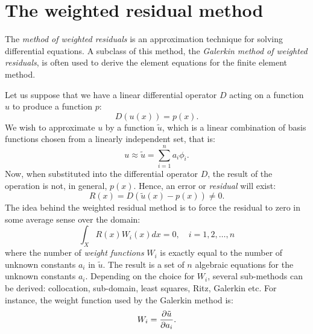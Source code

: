 \chapter{The weighted residual method}
\label{appendix2}

The \emph{method of weighted residuals} is an approximation technique for solving differential equations. A subclass of this method, the \emph{Galerkin method of weighted residuals}, is often used to derive the element equations for the finite element method. 

Let us suppose that we have a linear differential operator $ D $ acting on a function $ u $ to produce a function $ p $:
\begin{equation}
D(u(x)) = p(x).
\end{equation}
We wish to approximate $ u $ by a function $ \tilde{u} $, which is a linear combination of basis functions chosen from a linearly independent set, that is: 
\begin{equation}
u \approx \tilde{u} = \sum_{i=1}^n a_i \phi_i .
\end{equation}
Now, when substituted into the differential operator $ D $, the result of the operation is not, in general, $ p(x) $. Hence, an error or \emph{residual} will exist:
\begin{equation}
R(x) = D(\tilde{u}(x)-p(x)) \neq 0.
\end{equation}
The idea behind the weighted residual method is to force the residual to zero in some average sense over the domain:
\begin{equation}
\int_X R(x) W_i(x) dx = 0, \quad i = 1, 2, \ldots, n
\end{equation}
where the number of \emph{weight functions} $ W_i $ is exactly equal to the number of unknown constants $ a_i $ in $ \tilde{u} $. The result is a set of $ n $ algebraic equations for the unknown constants $ a_i $. Depending on the choice for $ W_i $, several sub-methods can be derived: collocation, sub-domain, least squares, Ritz, Galerkin etc. For instance, the weight function used by the Galerkin method  is:
\begin{equation}
W_i = \dfrac{\partial \tilde{u}}{\partial a_i}.
\end{equation}